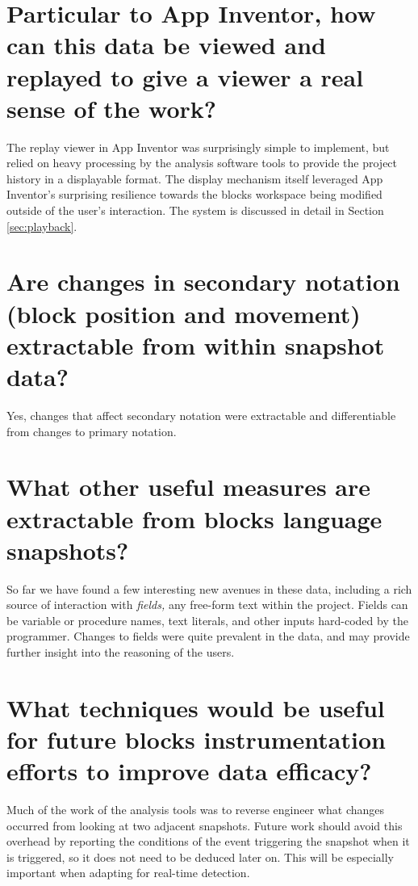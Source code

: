 \section{Particular to App Inventor, how can this data be viewed and replayed to give a viewer a real sense of the work?}
The replay viewer in App Inventor was surprisingly simple to implement, but relied on heavy processing by the analysis software tools to provide the project history in a displayable format. The display mechanism itself leveraged App Inventor's surprising resilience towards the blocks workspace being modified outside of the user's interaction. The system is discussed in detail in Section \ref{sec:playback}.

\section{Are changes in secondary notation (block position and movement) extractable from within snapshot data?}
Yes, changes that affect secondary notation were extractable and differentiable from changes to primary notation.

\section{What other useful measures are extractable from blocks language snapshots?}
So far we have found a few interesting new avenues in these data, including a rich source of interaction with \emph{fields,} any free-form text within the project. Fields can be variable or procedure names, text literals, and other inputs hard-coded by the programmer. Changes to fields were quite prevalent in the data, and may provide further insight into the reasoning of the users.

\section{What techniques would be useful for future blocks instrumentation efforts to improve data efficacy?}
Much of the work of the analysis tools was to reverse engineer what changes occurred from looking at two adjacent snapshots. Future work should avoid this overhead by reporting the conditions of the event triggering the snapshot when it is triggered, so it does not need to be deduced later on. This will be especially important when adapting for real-time detection.

